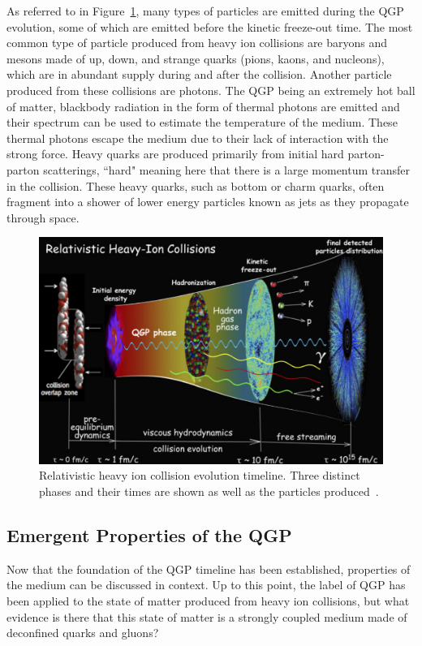 As referred to in Figure~\ref{fig:qgp_timeline}, many types of particles are emitted during the QGP evolution, some of which are emitted before the kinetic freeze-out time. The most common type of particle produced from heavy ion collisions are baryons and mesons made of up, down, and strange quarks (pions, kaons, and nucleons), which are in abundant supply during and after the collision. Another particle produced from these collisions are photons. The QGP being an extremely hot ball of matter, blackbody radiation in the form of thermal photons are emitted and their spectrum can be used to estimate the temperature of the medium. These thermal photons escape the medium due to their lack of interaction with the strong force. Heavy quarks are produced primarily from initial hard parton-parton scatterings, ``hard" meaning here that there is a large momentum transfer in the collision. These heavy quarks, such as bottom or charm quarks, often fragment into a shower of lower energy particles known as jets as they propagate through space.

\begin{figure}[!ht]
\centering
\includegraphics[width=0.78\linewidth]{figs/qgp_evolution_timeline.png}
\caption{Relativistic heavy ion collision evolution timeline. Three distinct phases and their times are shown as well as the particles produced~\cite{Heinz:2013wva}.}
\label{fig:qgp_timeline}
\end{figure}

\subsection{Emergent Properties of the QGP}
Now that the foundation of the QGP timeline has been established, properties of the medium can be discussed in context. Up to this point, the label of QGP has been applied to the state of matter produced from heavy ion collisions, but what evidence is there that this state of matter is a strongly coupled medium made of deconfined quarks and gluons?

